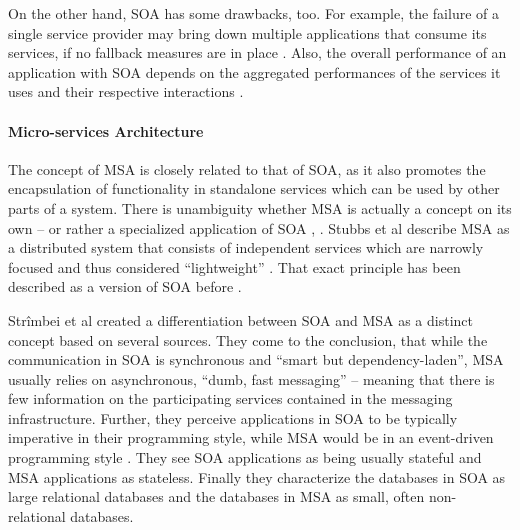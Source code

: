     On the other hand, \ac{SOA} has some drawbacks, too.
    For example, the failure of a single service provider may bring down multiple applications that consume its services, if no fallback measures are in place \cite[p.~408f]{Papazoglou2007Service}.
    Also, the overall performance of an application with \ac{SOA} depends on the aggregated performances of the services it uses and their respective interactions \cite[p.~408f]{Papazoglou2007Service}.


  \paragraph{Micro-services Architecture} %
    \label{par:micro_services_architecture}
    The concept of \ac{MSA} is closely related to that of \ac{SOA}, as it also promotes the encapsulation of functionality in standalone services which can be used by other parts of a system. There is unambiguity whether \ac{MSA} is actually a concept on its own -- or rather a specialized application of \ac{SOA} \cite[p.~35]{Stubbs2015Distributed}, \cite[p.~17]{Strimbei2015Software}.
    Stubbs et al describe \ac{MSA} as a distributed system that consists of independent services which are   narrowly focused and thus considered ``lightweight'' \cite[p.~35]{Stubbs2015Distributed}.
    That exact principle has been described as a version of \ac{SOA} before \cite[p.~395]{Papazoglou2007Service}.

    Strîmbei et al created a differentiation between SOA and MSA as a distinct concept based on several sources. They come to the conclusion, that while the communication in \ac{SOA} is synchronous and ``smart but dependency-laden'', \ac{MSA} usually relies on asynchronous, ``dumb, fast messaging'' -- meaning that there is few information on the participating services contained in the messaging infrastructure. Further, they perceive applications in \ac{SOA} to be typically imperative in their programming style, while \ac{MSA} would be in an event-driven programming style \cite[pp.~17-20]{Strimbei2015Software}. They see \ac{SOA} applications as being usually stateful and \ac{MSA} applications as stateless. Finally they characterize the databases in \ac{SOA} as large relational databases and the databases in \ac{MSA} as small, often non-relational databases.

